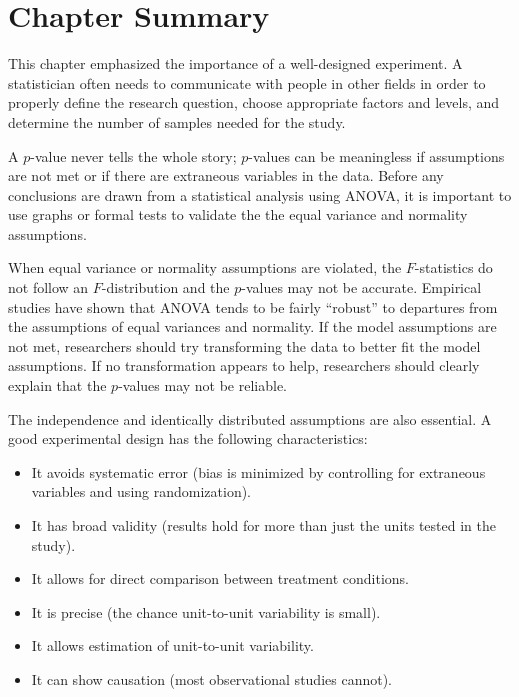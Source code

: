 \documentclass[
]{report}
\begin{document}
\hypertarget{chapter-summary-3}{%
\section*{\texorpdfstring{\textbf{Chapter Summary}}{Chapter Summary}}\label{chapter-summary-3}}

This chapter emphasized the importance of a well-designed experiment. A statistician often needs to communicate with people in other fields in order to properly define the research question, choose appropriate factors and levels, and determine the number of samples needed for the study.

A \(p\)-value never tells the whole story; \(p\)-values can be meaningless if assumptions are not met or if there are extraneous variables in the data. Before any conclusions are drawn from a statistical analysis using ANOVA, it is important to use graphs or formal tests to validate the the equal variance and normality assumptions.

When equal variance or normality assumptions are violated, the \(F\)-statistics do not follow an \(F\)-distribution and the \(p\)-values may not be accurate. Empirical studies have shown that ANOVA tends to be fairly ``robust'' to departures from the assumptions of equal variances and normality. If the model assumptions are not met, researchers should try transforming the data to better fit the model assumptions. If no transformation appears to help, researchers should clearly explain that the \(p\)-values may not be reliable.

The independence and identically distributed assumptions are also essential. A good experimental design has the following characteristics:

\begin{itemize}
    \item It avoids systematic error (bias is minimized by controlling for extraneous variables and using randomization).
    \item It has broad validity (results hold for more than just the units tested in the study).
    \item It allows for direct comparison between treatment conditions.
    \item It is precise (the chance unit-to-unit variability is small).
    \item It allows estimation of unit-to-unit variability.
    \item It can show causation (most observational studies cannot).
\end{itemize}
\end{document}
